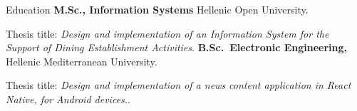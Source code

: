 \begin{rubric}{Education}
\entry*[2022 -- present]%
	\textbf{M.Sc., Information Systems} Hellenic Open University.
	\par Thesis title: \emph{Design and implementation of an Information System for the Support of Dining Establishment Activities}.
%
\entry*[2015 -- 2021]%
	\textbf{B.Sc.~Electronic Engineering,} Hellenic Mediterranean University.\par
	Thesis title: \emph{Design and implementation of a news content application in React
	Native, for Android devices.}.
\end{rubric}